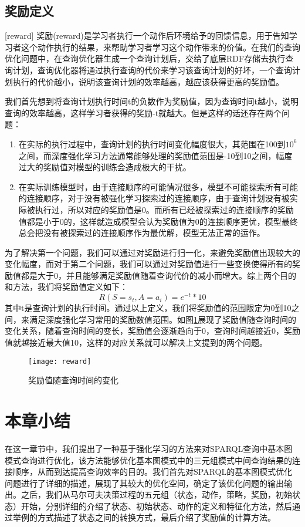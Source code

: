 \subsection{奖励定义}[reward]
奖励(reward)是学习者执行一个动作后环境给予的回馈信息，用于告知学习者这个动作执行的结果，来帮助学习者学习这个动作带来的价值。在我们的查询优化问题中，在查询优化器生成一个查询计划后，交给了底层RDF存储去执行查询计划，查询优化器将通过执行查询的代价来学习该查询计划的好坏，一个查询计划执行的代价越小，说明该查询计划的效率越高，越应该获得更高的奖励值。

我们首先想到将查询计划执行时间t的负数作为奖励值，因为查询时间t越小，说明查询的效率越高，这样学习者获得的奖励-t就越大。但是这样的话还存在两个问题：
\begin{enumerate}
    \item 在实际的执行过程中，查询计划的执行时间变化幅度很大，其范围在100到$10^6$之间，而深度强化学习方法通常能够处理的奖励值范围是-10到10之间，幅度过大的奖励值对模型的训练会造成极大的干扰。
    \item 在实际训练模型时，由于连接顺序的可能情况很多，模型不可能探索所有可能的连接顺序，对于没有被强化学习探索过的连接顺序，由于查询计划没有被实际被执行过，所以对应的奖励值是0。而所有已经被探索过的连接顺序的奖励值都是小于0的，这样就造成模型会认为奖励值为0的连接顺序更优，模型最终总会把没有被探索过的连接顺序作为最优解，模型无法正常的运作。
\end{enumerate}

为了解决第一个问题，我们可以通过对奖励进行归一化，来避免奖励值出现较大的变化幅度，而对于第二个问题，我们可以通过对奖励值进行一些变换使得所有的奖励值都是大于0，并且能够满足奖励值随着查询代价的减小而增大。综上两个目的和方法，我们将奖励值定义如下：
\begin{equation}
    R(S=s_t,A=a_i)=e^{-t}*10
\end{equation}
其中t是查询计划的执行时间。通过以上定义，我们将奖励值的范围限定为0到10之间，来满足深度强化学习常用的奖励数值范围。如图\ref{reward}展现了奖励值随查询时间的变化关系，随着查询时间的变长，奖励值会逐渐趋向于0，查询时间越接近0，奖励值就越接近最大值10，这样的对应关系就可以解决上文提到的两个问题。
\begin{figure}[h]
    \centering
    \texttt{[image: reward]}
    \caption{奖励值随查询时间的变化}
    \label{reward}
\end{figure}
\section{本章小结}
在这一章节中，我们提出了一种基于强化学习的方法来对SPARQL查询中基本图模式查询进行优化，该方法能够优化基本图模式中的三元组模式中间查询结果的连接顺序，从而到达提高查询效率的目的。我们首先对SPARQL的基本图模式优化问题进行了详细的描述，展现了其较大的优化空间，确定了该优化问题的输出输出。之后，我们从马尔可夫决策过程的五元组（状态，动作，策略，奖励，初始状态）开始，分别详细的介绍了状态、初始状态、动作的定义和特征化方法，然后通过举例的方式描述了状态之间的转换方式，最后介绍了奖励值的计算方法。


